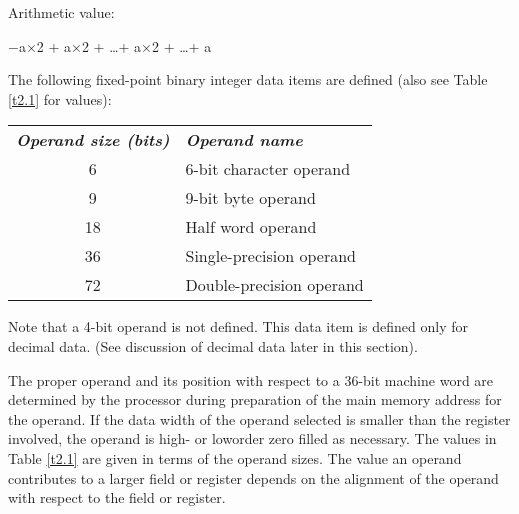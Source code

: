 Arithmetic value:

\hspace{1em}$-$a$\times$2 + a$\times$2 + \ldots + a$\times$2 + \ldots + a


The following fixed-point binary integer data items are defined (also see Table
\ref{t2.1} for values):

\begin{tabular}{ c l }
\textbf{\textit{Operand size (bits)}} & \textbf{\textit{Operand name}} \\
6 & 6-bit character operand \\
9 & 9-bit byte operand \\
18 & Half word operand \\
36 & Single-precision operand \\
72 & Double-precision operand \\
\end{tabular}


Note that a 4-bit operand is not defined. This data item is defined only for
decimal data.  (See discussion of decimal data later in this section).


The proper operand and its position with respect to a 36-bit machine word are
determined by the processor during preparation of the main memory address for
the operand. If the data width of the operand selected is smaller than the
register involved, the operand is high- or loworder zero filled as necessary.
The values in Table \ref{t2.1} are given in terms of the operand sizes. The value an
operand contributes to a larger field or register depends on the alignment of
the operand with respect to the field or register.  


